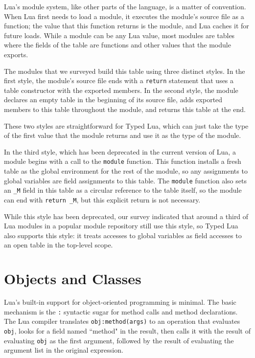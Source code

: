 \documentclass{sig-alternate}
\begin{document}
Lua's module system, like other parts of the language, is
a matter of convention. When Lua first needs to load a
module, it executes the module's source file as a function;
the value that this function returns is the module, and Lua
caches it for future loads. While a module can be any
Lua value, most modules are tables where the fields
of the table are functions and other values that the
module exports.

The modules that we surveyed build this table using
three distinct styles. In the first style, the module's
source file ends
with a {\tt return} statement that uses a table constructor
with the exported members. In the second style, the
module declares an empty table in the beginning of its
source file, adds exported members to this table
throughout the module, and returns this table at the end.

These two styles are straightforward for Typed Lua, which
can just take the type of the first value that the module
returns and use it as the type of the module.

In the third style, which has been deprecated in the current
version of Lua, a module begins with a call to the {\tt module}
function. This function installs a fresh table as the
global environment for the rest of the module, so any
assignments to global variables are field assignments to
this table. The {\tt module} function also sets an {\tt \_M}
field in this table as a circular reference to the table
itself, so the module can end with {\tt return \_M}, but
this explicit return is not necessary.

While this style has been deprecated, our survey indicated
that around a third of Lua modules in a popular module
repository still use this style, so Typed Lua also
supports this style: it treats accesses to global
variables as field accesses to an open table
in the top-level scope.

\section{Objects and Classes}
\label{sec:classes}

Lua's built-in support for object-oriented programming is
minimal. The basic mechanism is the {\tt :} syntactic
sugar for method calls and method declarations.
The Lua compiler translates {\tt obj:method(args)}
to an operation that evaluates {\tt obj}, looks
for a field named ``method" in the result, then calls
it with the result of evaluating {\tt obj} as the
first argument, followed by the result of evaluating
the argument list in the original expression.
\end{document}
